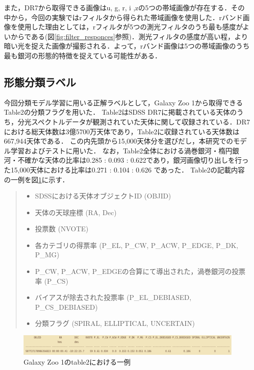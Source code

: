 \documentclass[a4j, 11pt]{jreport}
\begin{document}
また，DR7から取得できる画像はu, g, r, i ,zの5つの帯域画像が存在する．その中から，今回の実験ではrフィルタから得られた帯域画像を使用した．rバンド画像を使用した理由としては，rフィルタが5つの測光フィルタのうち最も感度がよいからである(図\ref{fig:filter_responces}参照)．測光フィルタの感度が高い程，より暗い光を捉えた画像が撮影される．よって，rバンド画像は5つの帯域画像のうち最も銀河の形態的特徴を捉えている可能性がある．

\subsection{形態分類ラベル}
今回分類モデル学習に用いる正解ラベルとして，Galaxy Zoo 1から取得できるTable2の分類フラグを用いた．
Table2はSDSS DR7に掲載されている天体のうち，分光スペクトルデータが観測されていた天体に関して収録されている．DR7における総天体数は3億5700万天体であり，Table2に収録されている天体数は667,944天体である．
この内先頭から15,000天体分を選びだし，本研究でのモデル学習およびテストに用いた．
なお，Table2全体における渦巻銀河・楕円銀河・不確かな天体の比率は0.285 : 0.093 : 0.622であり，銀河画像切り出しを行った15,000天体における比率は0.271 : 0.104 : 0.626 であった．
Table2の記載内容の一例を図\ref{fig:table2}に示す．

\begin{quote}
  \begin{itemize}
   \item SDSSにおける天体オブジェクトID (OBJID)
   \item 天体の天球座標 (RA, Dec)
   \item 投票数 (NVOTE)
   \item 各カテゴリの得票率 (P\_EL, P\_CW, P\_ACW, P\_EDGE, P\_DK, P\_MG)
   \item P\_CW, P\_ACW, P\_EDGEの合算にて導出された，渦巻銀河の投票率 (P\_CS)
   \item バイアスが除去された投票率 (P\_EL\_DEBIASED, P\_CS\_DEBIASED)
   \item 分類フラグ (SPIRAL, ELLIPTICAL, UNCERTAIN)
  \end{itemize}
\end{quote}

\begin{figure}[H]
  \centering
  \includegraphics[width=1\hsize,keepaspectratio]{images/table2.png}
  \caption{Galaxy Zoo 1のtable2における一例}
  \label{fig:table2}
\end{figure}
 
\end{document}
